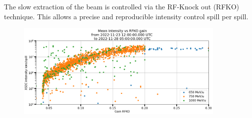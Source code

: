 The slow extraction of the beam is controlled via the RF-Knock out (RFKO) technique. This allows a precise and reproducible intensity control spill per spill.

\begin{figure}[h]
\includegraphics[width=0.9\textwidth]{images/xsec70_intensity_vs_gain.png}
\end{figure}
